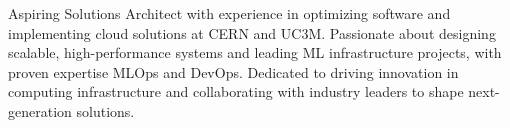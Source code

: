 

\begin{cvparagraph}
	Aspiring Solutions Architect with experience in optimizing software and implementing cloud solutions at CERN and UC3M.
	Passionate about designing scalable, high-performance systems and leading ML infrastructure projects, with proven expertise MLOps and DevOps.
	Dedicated to driving innovation in computing infrastructure and collaborating with industry leaders to shape next-generation solutions.
\end{cvparagraph}
